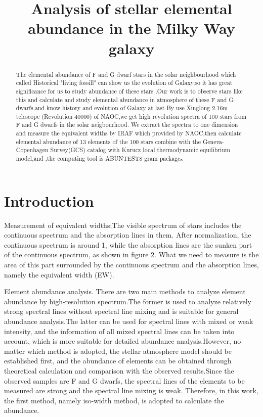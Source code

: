 \documentclass{aastex62}
\begin{document}
\title{Analysis of stellar elemental abundance in the Milky Way galaxy}

\begin{abstract}

    The elemental abundance of F and G dwarf stars in the solar neighbourhood which called Historical "living fossill" can show us the evolution of Galaxy,so it has great significance for us to study abundance of these stars
.Our work is to observe stars like this and calculate and study elemental abundance in atmosphere of these F and G dwarfs,and know history and evolution of Galaxy at last 
By use Xinglong 2.16m telescope (Revolution 40000) of NAOC,we get high revolution spectra of 100 stars from F and G dwarfs in the solar neigbourhood. We extract the spectra to one dimension and measure the equivalent widths by IRAF which provided by NAOC,then calculate elemental abundance of 13 elements of the 100 stars combine with the Geneva-Copenhagen Survey(GCS) catalog with Kurucz local thermodynamic equilibrium model,and ,the computing tool is ABUNTEST8 gram package。

\end{abstract}

\section{Introduction}

     Measurement of equivalent widths;The visible spectrum of stars includes the continuous spectrum and the absorption lines in them. After normalization, the continuous spectrum is around 1, while the absorption lines are the sunken part of the continuous spectrum, as shown in figure 2. What we need to measure is the area of this part surrounded by the continuous spectrum and the absorption lines, namely the equivalent width (EW).
       
       
       Element abundance analysis. There are two main methods to analyze element abundance by high-resolution spectrum.The former is used to analyze relatively strong spectral lines without spectral line mixing and is suitable for general abundance analysis.The latter can be used for spectral lines with mixed or weak intensity, and the information of all mixed spectral lines can be taken into account, which is more suitable for detailed abundance analysis.However, no matter which method is adopted, the stellar atmosphere model should be established first, and the abundance of elements can be obtained through theoretical calculation and comparison with the observed results.Since the observed samples are F and G dwarfs, the spectral lines of the elements to be measured are strong and the spectral line mixing is weak. Therefore, in this work, the first method, namely iso-width method, is adopted to calculate the abundance.
        
\end{document}
